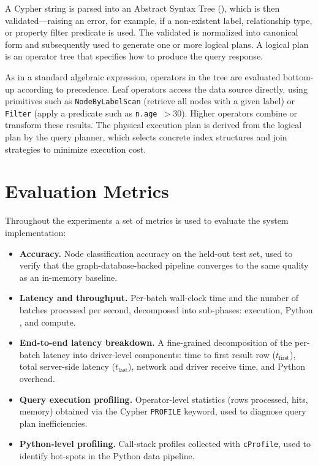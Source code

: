 A Cypher string is parsed into an Abstract Syntax Tree (), which is then
validated---raising an error, for example, if a non-existent label, relationship type,
or property filter predicate is used. The validated  is normalized into
canonical form and subsequently used to generate one or more logical plans. A logical
plan is an operator tree that specifies how to produce the query response.

As in a standard algebraic expression, operators in the tree are evaluated
bottom-up according to precedence. Leaf operators access the data source directly,
using primitives such as \texttt{NodeByLabelScan} (retrieve all nodes with a given
label) or \texttt{Filter} (apply a predicate such as \texttt{n.age}~$> 30$). Higher
operators combine or transform these results. The physical execution plan is derived
from the logical plan by the query planner, which selects concrete index structures and
join strategies to minimize execution cost.


\section{Evaluation Metrics}\label{sec:eval_metrics}

Throughout the experiments a set of metrics is used to evaluate the system
implementation:

\begin{itemize}
    \item \textbf{Accuracy.} Node classification accuracy on the held-out test set,
    used to verify that the graph-database-backed pipeline converges to the same
    quality as an in-memory baseline.

    \item \textbf{Latency and throughput.} Per-batch wall-clock time and the number
    of batches processed per second, decomposed into sub-phases: 
    execution, Python , and  compute.

    \item \textbf{End-to-end latency breakdown.} A fine-grained decomposition of the
    per-batch latency into driver-level components: time to first result row
    ($t_{\text{first}}$), total server-side latency ($t_{\text{last}}$), network and
    driver receive time, and Python  overhead.

    \item \textbf{Query execution profiling.} Operator-level statistics (rows
    processed,  hits, memory) obtained via the Cypher \texttt{PROFILE}
    keyword, used to diagnose query plan inefficiencies.

    \item \textbf{Python-level profiling.} Call-stack profiles collected with
    \texttt{cProfile}, used to identify hot-spots in the Python data pipeline.
\end{itemize}
